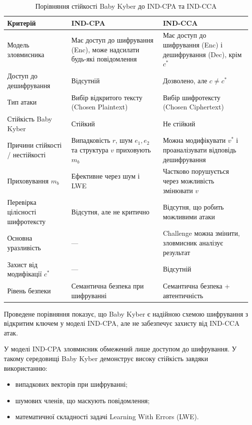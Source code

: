 \begin{table}[h]
    \centering
    \renewcommand{\arraystretch}{1.6}
    \setlength{\tabcolsep}{10pt}
    \caption{Порівняння стійкості Baby Kyber до IND-CPA та IND-CCA}
    \begin{tabular}{|p{5.3cm}|p{4.5cm}|p{4.5cm}|}
        \hline
        \textbf{Критерій} & \textbf{IND-CPA} & \textbf{IND-CCA} \\
        \hline
        Модель зловмисника & Має доступ до шифрування (Enc), може надсилати будь-які повідомлення & Має доступ до шифрування (Enc) і дешифрування (Dec), крім $c^*$ \\
        \hline
        Доступ до дешифрування & Відсутній & Дозволено, але $c \ne c^*$ \\
        \hline
        Тип атаки & Вибір відкритого тексту (Chosen Plaintext) & Вибір шифротексту (Chosen Ciphertext) \\
        \hline
        Стійкість Baby Kyber & Стійкий & Не стійкий \\
        \hline
        Причини стійкості / нестійкості & Випадковість $r$, шум $e_1, e_2$ та структура $v$ приховують $m_b$ & Можна модифікувати $v^*$ і проаналізувати відповідь дешифрування \\
        \hline
        Приховування $m_b$ & Ефективне через шум і LWE & Частково порушується через можливість змінювати $v$ \\
        \hline
        Перевірка цілісності шифротексту &  Відсутня, але не критично &  Відсутня, що робить можливими атаки \\
        \hline
        Основна уразливість & — & Challenge можна змінити, зловмисник аналізує результат \\
        \hline
        Захист від модифікації $c^*$ & — &  Відсутній \\
        \hline
        Рівень безпеки & Семантична безпека при шифруванні & Семантична безпека + автентичність \\
        \hline
    \end{tabular}
\end{table}

Проведене порівняння показує, що Baby Kyber є надійною схемою шифрування з відкритим ключем у моделі IND-CPA, але не забезпечує захисту від IND-CCA атак.

У моделі IND-CPA зловмисник обмежений лише доступом до шифрування. У такому середовищі Baby Kyber демонструє високу стійкість завдяки використанню:
\begin{itemize}
    \item випадкових векторів при шифруванні;
    \item шумових членів, що маскують повідомлення;
    \item математичної складності задачі Learning With Errors (LWE).
\end{itemize}

